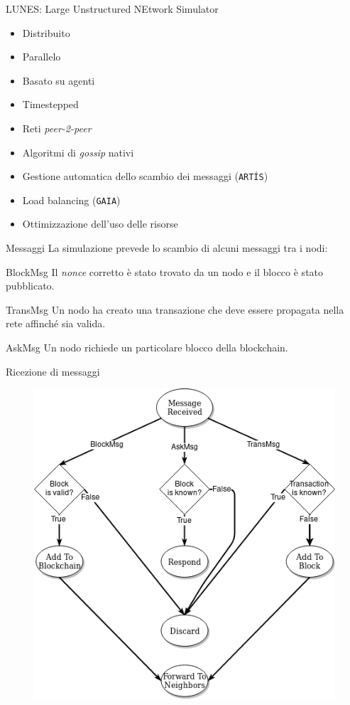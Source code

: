 \documentclass{beamer}
\begin{document}
\begin{frame}{LUNES: Large Unstructured NEtwork Simulator}
	\begin{itemize}
		\item Distribuito
        \item Parallelo
        \item Basato su agenti
        \item Timestepped
        \item Reti \textit{peer-2-peer}
        \item Algoritmi di \textit{gossip} nativi
        \item Gestione automatica dello scambio dei messaggi (\texttt{ARTÍS})
        \item Load balancing (\texttt{GAIA})
       	\item Ottimizzazione dell'uso delle risorse
	\end{itemize}
\end{frame}

\begin{frame}{Messaggi}
	La simulazione prevede lo scambio di alcuni messaggi tra i nodi:
	\begin{block}{BlockMsg}
		Il \textit{nonce} corretto è stato trovato da un nodo e il blocco è stato pubblicato.
	\end{block}
	\pause %
	\begin{block}{TransMsg}
		Un nodo ha creato una transazione che deve essere propagata nella rete affinché sia valida.
	\end{block}
	\pause %
	\begin{block}{AskMsg}
		Un nodo richiede un particolare blocco della blockchain.
	\end{block}
\end{frame}

\begin{frame}{Ricezione di messaggi}
	\begin{figure}
		\centering
        \includegraphics[width=0.65\linewidth]{./images/flow.png}
	\end{figure}
\end{frame}
\end{document}
